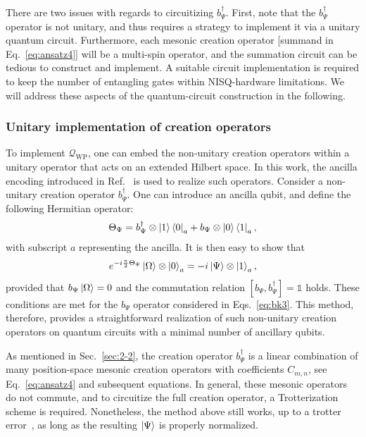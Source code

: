 \documentclass[a4paper,onecolumn,11pt,accepted=2024-10-11]{quantumarticle}
\begin{document}
There are two issues with regards to circuitizing $b_\Psi^\dagger$. First, note that the $b_\Psi^\dagger$ operator is not unitary, and thus requires a strategy to implement it via a unitary quantum circuit. Furthermore, each mesonic creation operator [summand in Eq.~\eqref{eq:ansatz4}] will be a multi-spin operator, and the summation circuit can be tedious to construct and implement. A suitable circuit implementation is required to keep the number of entangling gates within NISQ-hardware limitations. We will address these aspects of the quantum-circuit construction in the following.

\subsubsection{Unitary implementation of creation operators}
\label{sec:3-2-2}
To implement $\mathcal{Q}_{\text{WP}}$, one can embed the non-unitary creation operators within a unitary operator that acts on an extended Hilbert space. In this work, the ancilla encoding introduced in Ref.~\cite{Jordan:2011ci} is used to realize such operators. Consider a non-unitary creation operator $b_\Psi^{\dagger}$. One can introduce an ancilla qubit, and define the following Hermitian operator:
%
\begin{align}
\Theta_{\Psi} =  b_\Psi^{\dagger} \otimes \ket{1}\bra{0}_{a} +  b_\Psi \otimes \ket{0}\bra{1}_{a},
\end{align}
%
with subscript $a$ representing the ancilla. It is then easy to show that 
%
\begin{equation}
e^{-i \frac{\pi}{2} \Theta_{\Psi}} \ket{\Omega} \otimes \ket{0}_a = -i \ket{\Psi} \otimes \ket{1}_a,
\label{eq:anc1}
\end{equation}
%
provided that $b_\Psi \ket{\Omega}=0$ and the commutation relation $ [b_\Psi, b_\Psi^{\dagger}] = \mathds{1}$ holds. These conditions are met for the $b_\Psi$ operator considered in Eqs.~\eqref{eq:bk3}. This method, therefore, provides a straightforward realization of such non-unitary creation operators on quantum circuits with a minimal number of ancillary qubits. 

As mentioned in Sec.~\ref{sec:2-2}, the creation operator $b_\Psi^\dagger$ is a linear combination of many position-space mesonic creation operators with coefficients $C_{m,n}$, see Eq.~\eqref{eq:ansatz4} and subsequent equations. In general, these mesonic operators do not commute, and to circuitize the full creation operator, a Trotterization scheme is required. Nonetheless, the method above still works, up to a trotter error~\cite{Childs:2019hts}, as long as the resulting $\ket{\Psi}$ is properly normalized.
\end{document}
